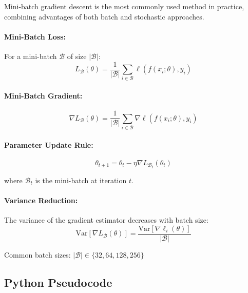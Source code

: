\documentclass{tufte-handout}
\begin{document}
Mini-batch gradient descent is the most commonly used method in practice, combining advantages of both batch and stochastic approaches.

\paragraph{Mini-Batch Loss:}
For a mini-batch $\mathcal{B}$ of size $|\mathcal{B}|$:
\begin{equation}
L_{\mathcal{B}}(\theta) = \frac{1}{|\mathcal{B}|} \sum_{i \in \mathcal{B}} \ell(f(x_i; \theta), y_i)
\end{equation}

\paragraph{Mini-Batch Gradient:}
\begin{equation}
\nabla L_{\mathcal{B}}(\theta) = \frac{1}{|\mathcal{B}|} \sum_{i \in \mathcal{B}} \nabla \ell(f(x_i; \theta), y_i)
\end{equation}

\paragraph{Parameter Update Rule:}
\begin{equation}
\theta_{t+1} = \theta_t - \eta \nabla L_{\mathcal{B}_t}(\theta_t)
\end{equation}

where $\mathcal{B}_t$ is the mini-batch at iteration $t$.

\paragraph{Variance Reduction:}
The variance of the gradient estimator decreases with batch size:
\begin{equation}
\text{Var}[\nabla L_{\mathcal{B}}(\theta)] = \frac{\text{Var}[\nabla \ell_i(\theta)]}{|\mathcal{B}|}
\end{equation}

Common batch sizes: $|\mathcal{B}| \in \{32, 64, 128, 256\}$

\subsection{Python Pseudocode}
\end{document}
